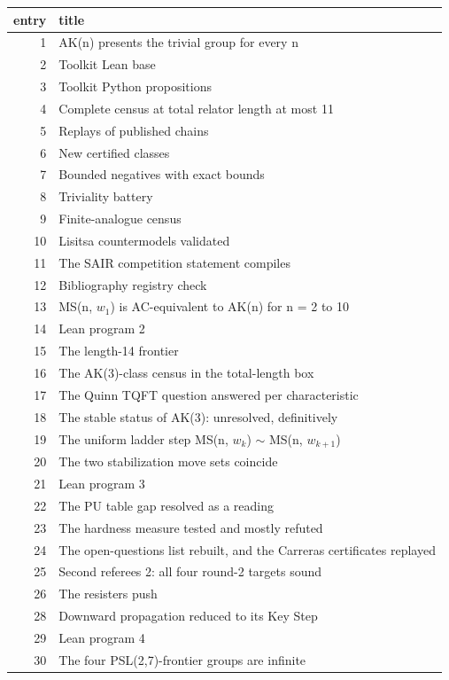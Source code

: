 \documentclass[11pt,a4paper]{article}
\theoremstyle{definition}
\begin{document}
\small
\begin{longtable}{rp{}}
\toprule
entry & title \\
\midrule
\endhead
1 & AK(n) presents the trivial group for every n \\
2 & Toolkit Lean base \\
3 & Toolkit Python propositions \\
4 & Complete census at total relator length at most 11 \\
5 & Replays of published chains \\
6 & New certified classes \\
7 & Bounded negatives with exact bounds \\
8 & Triviality battery \\
9 & Finite-analogue census \\
10 & Lisitsa countermodels validated \\
11 & The SAIR competition statement compiles \\
12 & Bibliography registry check \\
13 & MS(n, $w_1$) is AC-equivalent to AK(n) for n = 2 to 10 \\
14 & Lean program 2 \\
15 & The length-14 frontier \\
16 & The AK(3)-class census in the total-length box \\
17 & The Quinn TQFT question answered per characteristic \\
18 & The stable status of AK(3): unresolved, definitively \\
19 & The uniform ladder step MS(n, $w_k$) $\sim$ MS(n, $w_{k+1}$) \\
20 & The two stabilization move sets coincide \\
21 & Lean program 3 \\
22 & The PU table gap resolved as a reading \\
23 & The hardness measure tested and mostly refuted \\
24 & The open-questions list rebuilt, and the Carreras certificates replayed \\
25 & Second referees 2: all four round-2 targets sound \\
26 & The resisters push \\
28 & Downward propagation reduced to its Key Step \\
29 & Lean program 4 \\
30 & The four PSL(2,7)-frontier groups are infinite \\

\end{longtable}
\end{document}
